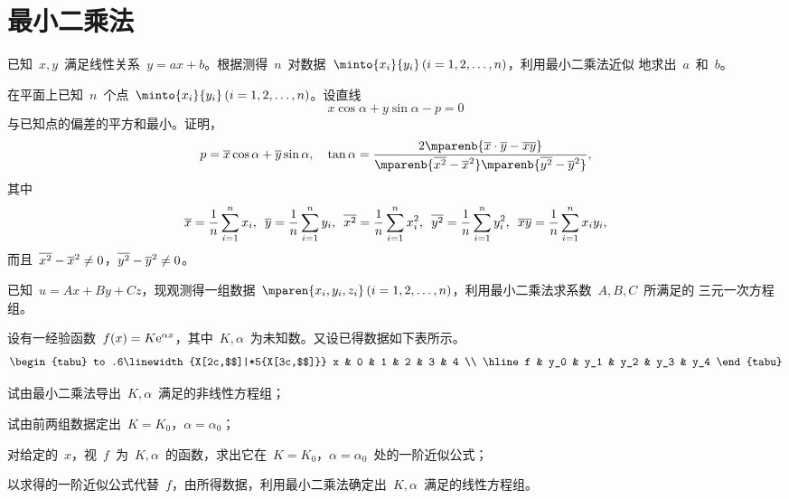 \section{最小二乘法}
\begin{exercise}
\item 已知~$x,y$~满足线性关系~$y=ax+b$。根据测得~$n$~对数据~$\minto{x_i}{y_i}\mcond{i=1,2,\dotsc,n}$，利用最小二乘法近似
地求出~$a$~和~$b$。
\item 在平面上已知~$n$~个点~$\minto{x_i}{y_i}\mcond{i=1,2,\dotsc,n}$。设直线
\[
  x\cos\alpha+y\sin\alpha-p=0
\]
与已知点的偏差的平方和最小。证明，
\[
  p=\mbar x\cos\alpha+\mbar y\sin\alpha,\quad
  \tan\alpha=\frac{2\mparenb{\mbar x\cdot\mbar y-\mbar{xy}}}{\mparenb{\mbar{x^2}-\mbar x^2}\mparenb{\mbar{y^2}-\mbar y^2}},
\]
其中
\[
  \overline{x}=\frac1n\sum_{i=1}^nx_i,\enspace\overline{y}=\frac1n\sum_{i=1}^ny_i,\enspace
  \overline{x^2}=\frac1n\sum_{i=1}^nx_i^2,\enspace\overline{y^2}=\frac1n\sum_{i=1}^ny_i^2,\enspace
  \overline{xy}=\frac1n\sum_{i=1}^nx_iy_i,
\]
而且~$\overline{x^2}-\overline{x}^2\neq0$，$\overline{y^2}-\overline{y}^2\neq0$。
\item 已知~$u=Ax+By+Cz$，现观测得一组数据~$\mparen{x_i,y_i,z_i}\mcond{i=1,2,\dotsc,n}$，利用最小二乘法求系数~$A,B,C$~所满足的
三元一次方程组。
\item 设有一经验函数~$f(x)=K\mathrm e^{\alpha x}$，其中~$K,\alpha$~为未知数。又设已得数据如下表所示。
\[
  \begin{tabu} to .6\linewidth{X[2c,$$]|*5{X[3c,$$]}}
    x & 0   & 1   & 2   & 3   & 4 \\ \hline
    f & y_0 & y_1 & y_2 & y_3 & y_4
  \end{tabu}
\]
\begin{exlist}
  \item 试由最小二乘法导出~$K,\alpha$~满足的非线性方程组；
  \item 试由前两组数据定出~$K=K_0$，$\alpha=\alpha_0$；
  \item 对给定的~$x$，视~$f$~为~$K,\alpha$~的函数，求出它在~$K=K_0$，$\alpha=\alpha_0$~处的一阶近似公式；
  \item 以求得的一阶近似公式代替~$f$，由所得数据，利用最小二乘法确定出~$K,\alpha$~满足的线性方程组。
\end{exlist}
\end{exercise}

